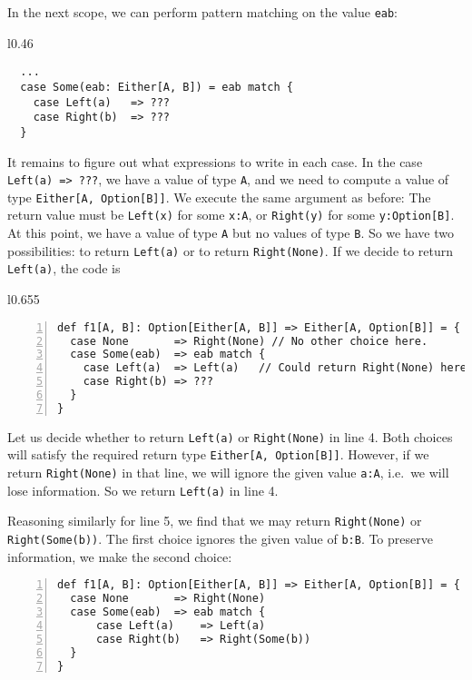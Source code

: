 In the next scope, we can perform pattern matching on the value \lstinline!eab!:

\begin{wrapfigure}{l}{0.46\columnwidth}%
\vspace{-0.8\baselineskip}
\begin{lstlisting}
  ...
  case Some(eab: Either[A, B]) = eab match {
    case Left(a)   => ???
    case Right(b)  => ???
  }
\end{lstlisting}

\vspace{-0.9\baselineskip}
\end{wrapfigure}%

\noindent It remains to figure out what expressions to write in each
case. In the case \lstinline!Left(a) => ???!, we have a value of
type \lstinline!A!, and we need to compute a value of type \lstinline!Either[A, Option[B]]!.
We execute the same argument as before: The return value must be \lstinline!Left(x)!
for some \lstinline!x:A!, or \lstinline!Right(y)! for some \lstinline!y:Option[B]!.
At this point, we have a value of type \lstinline!A! but no values
of type \lstinline!B!. So we have two possibilities: to return \lstinline!Left(a)!
or to return \lstinline!Right(None)!. If we decide to return \lstinline!Left(a)!,
the code is

\begin{wrapfigure}{l}{0.655\columnwidth}%
\vspace{-0.6\baselineskip}
\begin{lstlisting}[numbers=left,numberstyle={\small}]
def f1[A, B]: Option[Either[A, B]] => Either[A, Option[B]] = {
  case None       => Right(None) // No other choice here.
  case Some(eab)  => eab match {
    case Left(a)  => Left(a)   // Could return Right(None) here.
    case Right(b) => ???
  }
}
\end{lstlisting}

\vspace{-0.8\baselineskip}
\end{wrapfigure}%

\noindent Let us decide whether to return \lstinline!Left(a)! or
\lstinline!Right(None)! in line 4. Both choices will satisfy the
required return type \lstinline!Either[A, Option[B]]!. However, if
we return \lstinline!Right(None)! in that line, we will ignore the
given value \lstinline!a:A!, i.e.~we will lose information.
So we return \lstinline!Left(a)! in line 4.

Reasoning similarly for line 5, we find that we may return \lstinline!Right(None)!
or \lstinline!Right(Some(b))!. The first choice ignores the given
value of \lstinline!b:B!. To preserve information, we make the second
choice:
\begin{lstlisting}[numbers=left,numberstyle={\small}]
def f1[A, B]: Option[Either[A, B]] => Either[A, Option[B]] = {
  case None       => Right(None)
  case Some(eab)  => eab match {
      case Left(a)    => Left(a)
      case Right(b)   => Right(Some(b))
  }
}
\end{lstlisting}

